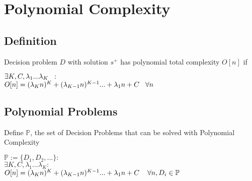 \documentclass[11pt]{article}
\begin{document}


















\newpage
\section{Polynomial Complexity}

\subsection{Definition}
Decision problem $D$ with solution $s^+$ has polynomial total complexity $O[n]$ if
\begin{center}
$\exists K,C,\lambda_1...\lambda_K \hspace{2mm} :$
\\ \vspace{2mm}
$O[n] = (\lambda_K n)^K + (\lambda_{K-1} n)^{K-1}... + \lambda_1 n + C \hspace{3mm} \forall n$
\end{center}





\subsection{Polynomial Problems}
Define $\mathbb{P}$, the set of Decision Problems that can be solved with Polynomial Complexity
\begin{center}
$
\mathbb{P} := \{D_1,D_2,...\} : 
$
\\
$
\exists K,C,\lambda_1...\lambda_K : 
$
\\
$
O[n] = (\lambda_K n)^K + (\lambda_{K-1} n)^{K-1}... + \lambda_1 n + C \hspace{4mm} \forall n, D_i \in \mathbb{P}
$
\end{center}
\end{document}
